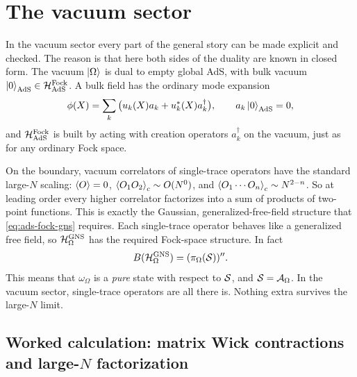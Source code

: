 \section{The vacuum sector}

In the vacuum sector every part of the general story can be made explicit and checked. The reason is that here
both sides of the duality are known in closed form. The vacuum $\ket\Omega$ is dual to empty global AdS, with
bulk vacuum $\ket0_{\text{AdS}}\in\mathcal{H}_{\text{AdS}}^{\text{Fock}}$. A bulk field has the ordinary mode expansion
\begin{equation}
\phi(X)=\sum_k\big(u_k(X)a_k+u_k^*(X)a_k^\dagger\big), \qquad a_k\ket0_{\text{AdS}}=0 ,
\label{eq:ads-bulkmodes}
\end{equation}
and $\mathcal{H}_{\text{AdS}}^{\text{Fock}}$ is built by acting with creation operators $a_k^\dagger$ on the vacuum, just
as for any ordinary Fock space.

On the boundary, vacuum correlators of single-trace operators have the standard large-$N$ scaling:
$\braket{O}=0$, $\braket{O_1O_2}_c\sim O(N^0)$, and $\braket{O_1\cdots O_n}_c\sim N^{2-n}$. So at leading order
every higher correlator factorizes into a sum of products of two-point functions. This is exactly the Gaussian,
generalized-free-field structure that \eqref{eq:ads-fock-gns} requires. Each single-trace operator behaves like
a generalized free field, so $\mathcal{H}_\Omega^{\text{GNS}}$ has the required Fock-space structure. In fact
\[
B(\mathcal{H}_\Omega^{\text{GNS}})=(\pi_\Omega(\mathcal{S}))'' .
\]
This means that $\omega_\Omega$ is a \emph{pure} state with respect to $\mathcal{S}$, and $\mathcal{S}=\mathcal{A}_\Omega$. In the
vacuum sector, single-trace operators are all there is. Nothing extra survives the large-$N$ limit.

\subsection*{Worked calculation: matrix Wick contractions and large-\texorpdfstring{$N$}{N} factorization}

